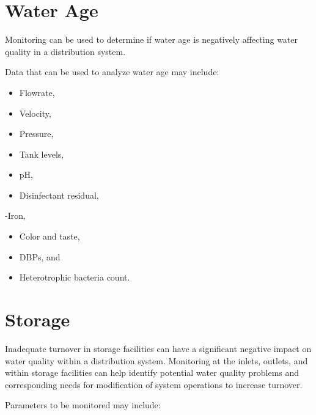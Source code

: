 \documentclass[10pt]{article}
\begin{document}
\section{Water Age}
Monitoring can be used to determine if water age is negatively affecting water quality in a distribution system.

Data that can be used to analyze water age may include:

\begin{itemize}
  \item Flowrate,

  \item Velocity,

  \item Pressure,

  \item Tank levels,

  \item $\mathrm{pH}$,

  \item Disinfectant residual,

\end{itemize}
-Iron,

\begin{itemize}
  \item Color and taste,

  \item DBPs, and

  \item Heterotrophic bacteria count.

\end{itemize}
\section{Storage}
Inadequate turnover in storage facilities can have a significant negative impact on water quality within a distribution system. Monitoring at the inlets, outlets, and within storage facilities can help identify potential water quality problems and corresponding needs for modification of system operations to increase turnover.

Parameters to be monitored may include:
\end{document}
